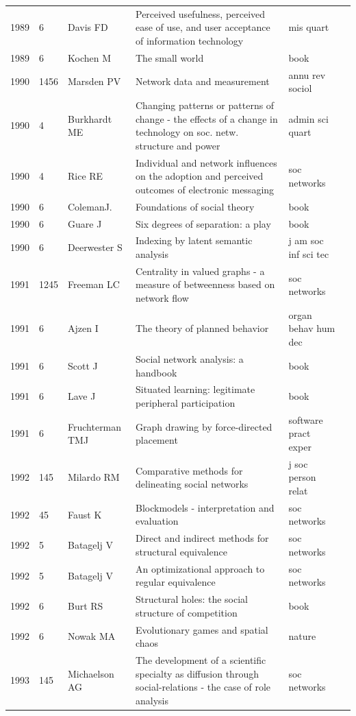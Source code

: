 \documentclass[11pt]{article} %
\begin{document}
\begin{landscape}
\begin{longtable}{p{0.7cm}|p{0.8cm}|p{3cm}|p{14.5cm}|p{3.5cm}l}
1989& 	6& 	 Davis FD& 	 Perceived usefulness, perceived ease of use, and user acceptance of information technology& 	 mis quart\\
1989& 	6& 	 Kochen M & 	 The small world& 	 book\\
1990& 	1456& 	 Marsden PV& 	 Network data and measurement& 	 annu rev sociol\\
1990& 	4& 	 Burkhardt ME& 	 Changing patterns or patterns of change - the effects of a change in technology on soc. netw. structure and power& 	 admin sci quart\\
1990& 	4& 	 Rice RE& 	 Individual and network influences on the adoption and perceived outcomes of electronic messaging& 	 soc networks\\
1990& 	6& 	 ColemanJ.& 	 Foundations of social theory& 	 book\\
1990& 	6& 	 Guare J& 	 Six degrees of separation: a play& 	 book\\
1990& 	6& 	 Deerwester S& 	 Indexing by latent semantic analysis& 	 j am soc inf sci tec\\
1991& 	1245& 	 Freeman LC& 	 Centrality in valued graphs - a measure of betweenness based on network flow& 	 soc networks\\
1991& 	6& 	 Ajzen I& 	 The theory of planned behavior& 	 organ behav hum dec\\
1991& 	6& 	 Scott J& 	 Social network analysis: a handbook & 	 book\\
1991& 	6& 	 Lave J & 	 Situated learning: legitimate peripheral participation & 	 book\\
1991& 	6& 	 Fruchterman TMJ& 	 Graph drawing by force-directed placement& 	 software pract exper\\
1992& 	145& 	 Milardo RM& 	 Comparative methods for delineating social networks& 	 j soc person relat\\
1992& 	45& 	 Faust K& 	 Blockmodels - interpretation and evaluation& 	 soc networks\\
1992& 	5& 	 Batagelj V& 	 Direct and indirect methods for structural equivalence& 	 soc networks\\
1992& 	5& 	 Batagelj V& 	 An optimizational approach to regular equivalence& 	 soc networks\\
1992& 	6& 	 Burt RS & 	 Structural holes: the social structure of competition& 	 book\\
1992& 	6& 	 Nowak MA& 	 Evolutionary games and spatial chaos& 	 nature\\
1993& 	145& 	 Michaelson AG& 	 The development of a scientific specialty as diffusion through social-relations - the case of role analysis& 	 soc networks\\

\end{longtable}
\end{landscape}
\end{document}
